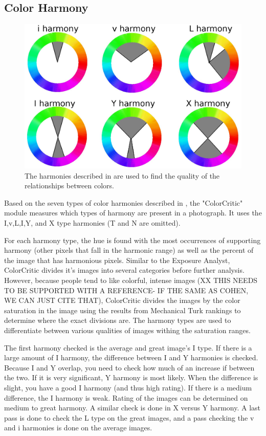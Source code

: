 \documentclass[twocolumn]{article}
\begin{document}
\subsection{Color Harmony}   
\begin{figure}[t]
  \centering
    \includegraphics[scale=0.38,clip]{colorharmony.eps}
  \caption{The harmonies described in \cite{COL:COL10004} are used to find the quality of the relationships between colors.}
\end{figure}

Based on the seven types of color harmonies described in \cite{Cohen-Or:2006:CH:1179352.1141933}, the "ColorCritic" module measures which types of harmony are present in a photograph. It uses the I,v,L,I,Y, and X type harmonies (T and N are omitted).

For each harmony type, the hue is found with the most occurrences of supporting harmony (other pixels that fall in the harmonic range) as well as the percent of the image that has harmonious pixels. Similar to the Exposure Analyst, ColorCritic divides it's images into several categories before further analysis. However, because people tend to like colorful, intense images (XX THIS NEEDS TO BE SUPPORTED WITH A REFERENCE- IF THE SAME AS COHEN, WE CAN JUST CITE THAT), ColorCritic divides the images by the color saturation in the image using the results from Mechanical Turk rankings to determine where the exact divisions are. The harmony types are used to differentiate between various qualities of images withing the saturation ranges.

The first harmony checked is the average and great image's I type. If there is a large amount of I harmony, the difference between I and Y harmonies is checked. Because I and Y overlap, you need to check how much of an increase if between the two. If it is very significant, Y harmony is most likely. When the difference is slight, you have a good I harmony (and thus high rating). If there is a medium difference, the I harmony is weak. Rating of the images can be determined on medium to great harmony. A similar check is done in X versus Y harmony. A last pass is done to check the L type on the great images, and a pass checking the v and i harmonies is done on the average images.
\end{document}
